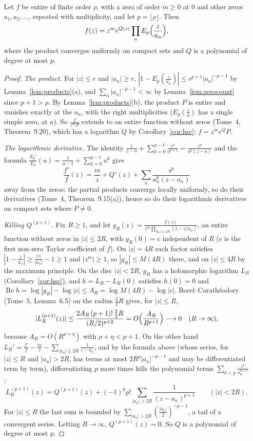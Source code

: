 \begin{theorem}\label{thm:hadamardgen}
Let $f$ be entire of finite order $\rho$, with a zero of order $m\ge0$ at $0$ and other zeros $a_1,a_2,\dots$, repeated with multiplicity, and let $p=\lfloor\rho\rfloor$. Then
\[
f(z)=z^me^{Q(z)}\prod_nE_p\Bigl(\frac z{a_n}\Bigr),
\]
where the product converges uniformly on compact sets and $Q$ is a polynomial of degree at most $p$.
\end{theorem}
\begin{proof}
\emph{The product.} For $|z|\le r$ and $|a_n|\ge r$, $|1-E_p(\frac z{a_n})|\le r^{p+1}|a_n|^{-p-1}$ by Lemma~\ref{lem:products}(a), and $\sum_n|a_n|^{-p-1}<\infty$ by Lemma~\ref{lem:zerocount} since $p+1>\rho$. By
Lemma~\ref{lem:products}(b), the product $P$ is entire and vanishes exactly at the $a_n$, with the right multiplicities ($E_p(\frac z a)$ has a single simple zero, at $a$). So $\frac f{z^mP}$ extends to an entire
function without zeros (Tome~4, Theorem~9.20), which has a logarithm $Q$ by Corollary~\ref{cor:hsc}: $f=z^me^QP$.

\emph{The logarithmic derivative.} The identity $\frac1{z-a}+\sum_{k=0}^{p-1}\frac{z^k}{a^{k+1}}=\frac{z^p}{a^p(z-a)}$ and the formula $\frac{E_p'}{E_p}(u)=\frac1{u-1}+\sum_{k=0}^{p-1}u^k$ give
\[
\frac{f'}f(z)=\frac mz+Q'(z)+\sum_n\frac{z^p}{a_n^p(z-a_n)}
\]
away from the zeros: the partial products converge locally uniformly, so do their derivatives (Tome~4, Theorem~9.15(a)), hence so do their logarithmic derivatives on compact sets where $P\ne0$.

\emph{Killing $Q^{(p+1)}$.} Fix $R\ge1$, and let $g_R(z)=\frac{f(z)}{z^m\prod_{|a_n|\le2R}(1-z/a_n)}$, an entire function without zeros in $|z|\le2R$, with $g_R(0)=c$ independent of $R$ ($c$ is the first non-zero
Taylor coefficient of $f$). On $|z|=4R$ each factor satisfies $|1-\frac z{a_n}|\ge\frac{|z|}{|a_n|}-1\ge1$ and $|z^m|\ge1$, so $|g_R|\le M(4R)$ there, and on $|z|\le4R$ by the maximum principle. On the disc $|z|<2R$, $g_R$ has
a holomorphic logarithm $L_R$ (Corollary~\ref{cor:hsc}), and $h=L_R-L_R(0)$ satisfies $h(0)=0$ and $\operatorname{Re}h=\log|g_R|-\log|c|\le A_R=\log M(4R)-\log|c|$. Borel--Carath\'eodory (Tome~5, Lemma~6.5) on the
radius $\frac32R$ gives, for $|z|\le R$,
\[
|L_R^{(p+1)}(z)|\le\frac{2A_R\,(p+1)!\,\frac32R}{(R/2)^{p+2}}=O\Bigl(\frac{A_R}{R^{p+1}}\Bigr)\longrightarrow0\quad(R\to\infty),
\]
because $A_R=O(R^{\rho+\eta})$ with $\rho+\eta<p+1$. On the other hand $L_R'=\frac{f'}f-\frac mz-\sum_{|a_n|\le2R}\frac1{z-a_n}$, and by the formula above (whose series, for $|z|\le R$ and $|a_n|>2R$, has terms at most $2R^p|a_n|^{-p-1}$ and may be differentiated term by term), differentiating $p$ more
times kills the polynomial terms $\sum_{k<p}\frac{z^k}{a_n^{k+1}}$:
\[
L_R^{(p+1)}(z)=Q^{(p+1)}(z)+(-1)^pp!\sum_{|a_n|>2R}\frac1{(z-a_n)^{p+1}}\qquad(|z|<2R).
\]
For $|z|\le R$ the last sum is bounded by $\sum_{|a_n|>2R}(\frac{|a_n|}2)^{-p-1}$, a tail of a convergent series. Letting $R\to\infty$, $Q^{(p+1)}(z)=0$. So $Q$ is a polynomial of degree at most $p$.
\end{proof}

